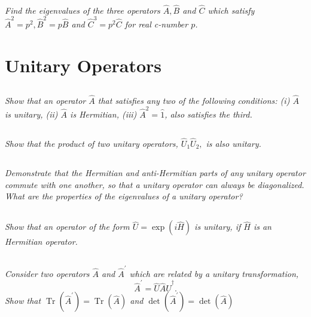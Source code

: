 \documentclass[12pt, letterpaper]{article}
\begin{document}
\subsection{}
\textit{Find the eigenvalues of the three operators $\hat{A}, \hat{B}$ and $\hat{C}$ which satisfy $\hat{A}^{2}=p^{2}, \hat{B}^{2}=p \hat{B}$ and $\hat{C}^{3}=p^{2} \hat{C}$ for real c-number $p$.}

\section{Unitary Operators}
\subsection{}
\textit{Show that an operator $\hat{A}$ that satisfies any two of the following conditions: (i) $\hat{A}$ is unitary, (ii) $\hat{A}$ is Hermitian, (iii) $\hat{A}^2 =\hat{1}$, also satisfies the third. }
\subsection{}
\textit{Show that the product of two unitary operators, $\hat{U}_{1} \hat{U}_{2},$ is also unitary.}
\subsection{}
\textit{Demonstrate that the Hermitian and anti-Hermitian parts of any unitary operator commute with one another, so that a unitary operator can always be diagonalized. What are the properties of the eigenvalues of a unitary operator?}
\subsection{}
\textit{Show that an operator of the form $\hat{U}=\exp (i \hat{H})$ is unitary, if $\hat{H}$ is an Hermitian operator.}
\subsection{}
\textit{Consider two operators $\hat{A}$ and $\hat{A}^{\prime}$ which are related by a unitary transformation,} 
$$
\hat{A}^{\prime}=\hat{U} \hat{A} \hat{U}^{\dagger}.
$$
\textit{Show that $\operatorname{Tr}\left(\hat{A}^{\prime}\right)=\operatorname{Tr}(\hat{A})$ and $\operatorname{det}\left(\hat{A}^{\prime}\right)=\operatorname{det}(\hat{A})$}
\end{document}
